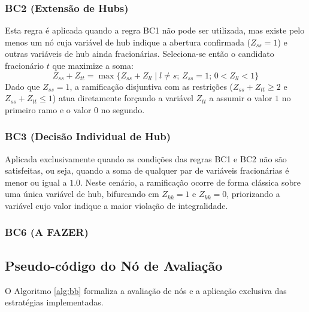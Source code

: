 \subsubsection{BC2 (Extensão de Hubs)}
Esta regra é aplicada quando a regra BC1 não pode ser utilizada, mas existe pelo menos um nó cuja variável de hub indique a abertura confirmada ($Z_{ss}=1$) e outras variáveis de hub ainda fracionárias. Seleciona-se então o candidato fracionário $t$ que maximize a soma:
\begin{equation*}
    Z_{ss} + Z_{tt} = \max \{ Z_{ss} + Z_{ll} \mid l \neq s;\, Z_{ss} = 1;\, 0 < Z_{ll} < 1 \}
\end{equation*}
Dado que $Z_{ss}=1$, a ramificação disjuntiva com as restrições ($Z_{ss} + Z_{tt} \ge 2$ e $Z_{ss} + Z_{tt} \le 1$) atua diretamente forçando a variável $Z_{tt}$ a assumir o valor $1$ no primeiro ramo e o valor $0$ no segundo.

\subsubsection{BC3 (Decisão Individual de Hub)}
Aplicada exclusivamente quando as condições das regras BC1 e BC2 não são satisfeitas, ou seja, quando a soma de qualquer par de variáveis fracionárias é menor ou igual a $1.0$. Neste cenário, a ramificação ocorre de forma clássica sobre uma única variável de hub, bifurcando em $Z_{kk}=1$ e $Z_{kk}=0$, priorizando a variável cujo valor indique a maior violação de integralidade.


\subsubsection{BC6 (A FAZER)}

\subsection{Pseudo-código do Nó de Avaliação}

O Algoritmo \ref{alg:bb} formaliza a avaliação de nós e a aplicação exclusiva das estratégias implementadas.

